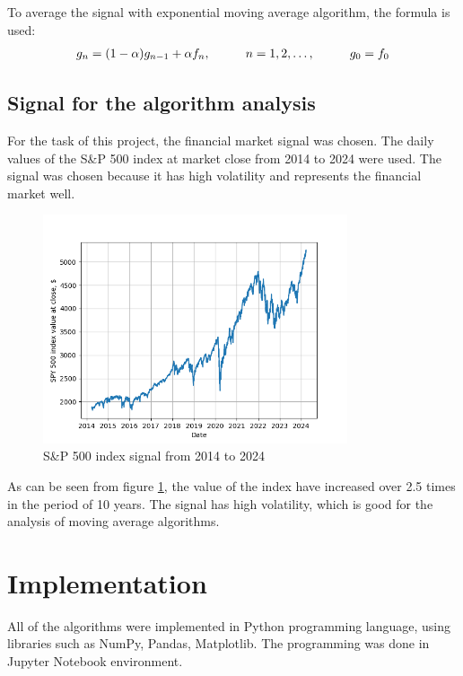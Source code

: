 \documentclass[a4paper,12pt,fleqn]{article}
\begin{document}
        To average the signal with exponential moving average algorithm, 
        the formula is used: \begin{gather}
            g_n = (1-\alpha) g_{n-1} + \alpha f_n, \hspace{1 cm} n = 1, 2, \dots , \hspace{1 cm} g_0 = f_0
        \end{gather}
        
        \subsection{Signal for the algorithm analysis}
        \hspace{1em}For the task of this project, the financial market signal was chosen. The daily values of 
        the S\&P 500 index\cite{SP500} at market close from 2014 to 2024 were used. The signal was chosen because it has
         high volatility and represents the financial market well. 


        \begin{figure}[ht]
            \centering
            \includegraphics[width=0.8\textwidth]{images/SP500.png} %
            \caption{S\&P 500 index signal from 2014 to 2024}
            \label{fig:SP500}
        \end{figure}

        As can be seen from figure \ref{fig:SP500}, the value of the index have increased over 2.5 times in the
        period of 10 years. The signal has high volatility, which is good for the analysis of moving average algorithms.
        
        
        
        \newpage
        \section{Implementation}
\hspace{1 em} All of the algorithms were implemented in Python programming language, using libraries
such as NumPy, Pandas, Matplotlib. The programming was done in Jupyter Notebook environment. 
\end{document}
